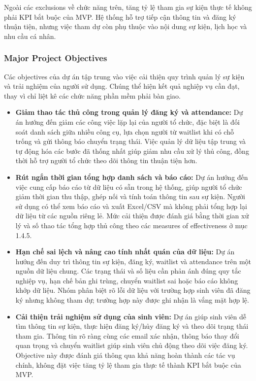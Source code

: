 Ngoài các exclusions về chức năng trên, tăng tỷ lệ tham gia sự kiện thực tế không phải KPI bắt buộc của MVP. Hệ thống hỗ trợ tiếp cận thông tin và đăng ký thuận tiện, nhưng việc tham dự còn phụ thuộc vào nội dung sự kiện, lịch học và nhu cầu cá nhân.

\subsubsection{Major Project Objectives}

Các objectives của dự án tập trung vào việc cải thiện quy trình quản lý sự kiện và trải nghiệm của người sử dụng. Chúng thể hiện kết quả nghiệp vụ cần đạt, thay vì chỉ liệt kê các chức năng phần mềm phải bàn giao.

\begin{itemize}
\item \textbf{Giảm thao tác thủ công trong quản lý đăng ký và attendance:} Dự án hướng đến giảm các công việc lặp lại của người tổ chức, đặc biệt là đối soát danh sách giữa nhiều công cụ, lựa chọn người từ waitlist khi có chỗ trống và gửi thông báo chuyển trạng thái. Việc quản lý dữ liệu tập trung và tự động hóa các bước đã thống nhất giúp giảm nhu cầu xử lý thủ công, đồng thời hỗ trợ người tổ chức theo dõi thông tin thuận tiện hơn.

\item \textbf{Rút ngắn thời gian tổng hợp danh sách và báo cáo:} Dự án hướng đến việc cung cấp báo cáo từ dữ liệu có sẵn trong hệ thống, giúp người tổ chức giảm thời gian thu thập, ghép nối và tính toán thông tin sau sự kiện. Người sử dụng có thể xem báo cáo và xuất Excel/CSV mà không phải tổng hợp lại dữ liệu từ các nguồn riêng lẻ. Mức cải thiện được đánh giá bằng thời gian xử lý và số thao tác tổng hợp thủ công theo các measures of effectiveness ở mục 1.4.5.

\item \textbf{Hạn chế sai lệch và nâng cao tính nhất quán của dữ liệu:} Dự án hướng đến duy trì thông tin sự kiện, đăng ký, waitlist và attendance trên một nguồn dữ liệu chung. Các trạng thái và số liệu cần phản ánh đúng quy tắc nghiệp vụ, hạn chế bản ghi trùng, chuyển waitlist sai hoặc báo cáo không khớp dữ liệu. Nhóm phân biệt rõ lỗi dữ liệu với trường hợp sinh viên đã đăng ký nhưng không tham dự; trường hợp này được ghi nhận là vắng mặt hợp lệ.

\item \textbf{Cải thiện trải nghiệm sử dụng của sinh viên:} Dự án giúp sinh viên dễ tìm thông tin sự kiện, thực hiện đăng ký/hủy đăng ký và theo dõi trạng thái tham gia. Thông tin rõ ràng cùng các email xác nhận, thông báo thay đổi quan trọng và chuyển waitlist giúp sinh viên chủ động theo dõi việc đăng ký. Objective này được đánh giá thông qua khả năng hoàn thành các tác vụ chính, không đặt việc tăng tỷ lệ tham gia thực tế thành KPI bắt buộc của MVP.
\end{itemize}

